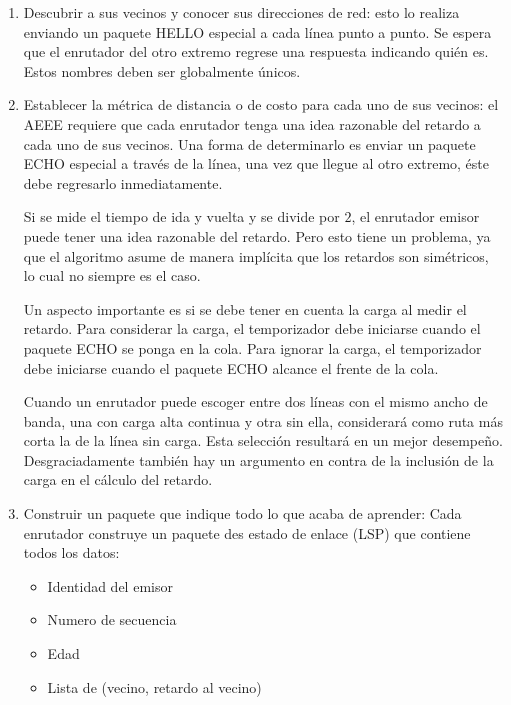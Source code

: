 \documentclass[10pt,a4paper]{report}
\begin{document}
	\begin{enumerate}
		\item Descubrir a sus vecinos y conocer sus direcciones de red: esto lo realiza 
		enviando un paquete HELLO especial a cada línea punto a punto. Se espera que 
		el 	enrutador del otro extremo regrese una respuesta indicando quién es. Estos
		nombres deben ser globalmente únicos.

		\item Establecer la métrica de distancia o de costo para cada uno de sus vecinos:
		el AEEE requiere que cada enrutador tenga una idea razonable del retardo a cada 
		uno de sus vecinos. Una forma de determinarlo es enviar un paquete ECHO 
		especial a través de la línea, una vez que llegue al otro extremo, éste debe 
		regresarlo inmediatamente.

		\par Si se mide el tiempo de ida y vuelta y se divide por $2$, el enrutador emisor 
		puede tener una idea razonable del retardo. Pero esto tiene un problema, ya que 
		el algoritmo asume de manera implícita que los retardos son simétricos, lo cual no 
		siempre es el caso.

		\par Un aspecto importante es si se debe tener en cuenta la carga al medir el 
		retardo. Para considerar la carga, el temporizador debe iniciarse cuando el paquete 
		ECHO se ponga en la cola. Para ignorar la carga, el temporizador debe iniciarse 
		cuando el paquete ECHO alcance el frente de la cola.
		
		\par Cuando un enrutador puede escoger entre dos líneas con el mismo ancho de 
		banda, una con carga alta continua y otra sin ella, considerará como ruta más 
		corta la de la línea sin carga. Esta selección resultará en un mejor desempeño. 		
		Desgraciadamente también hay un argumento en contra de la inclusión de la carga 
		en el cálculo del retardo.

		\item Construir un paquete que indique todo lo que acaba de aprender: Cada 
		enrutador construye un paquete des estado de enlace (LSP) que contiene todos 
		los datos:
		\begin{itemize}
			\item Identidad del emisor
			\item Numero de secuencia
			\item Edad
			\item Lista de (vecino, retardo al vecino)
		\end{itemize}


\end{enumerate}
\end{document}
